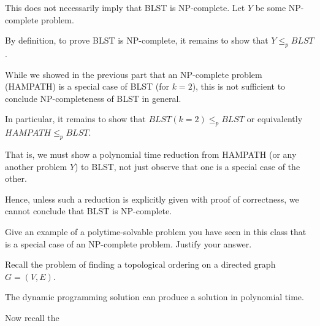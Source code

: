 \begin{questions}
	\ifsolutions\fi

	\begin{soln}
		This does not necessarily imply that BLST is NP-complete. Let \(Y\) be some NP-complete problem.

		By definition, to prove BLST is NP-complete, it remains to show that \(Y \leq_p BLST\).

		While we showed in the previous part that an NP-complete problem (HAMPATH) is a special case of BLST (for \( k = 2 \)), this is not sufficient to conclude NP-completeness of BLST in general.

		In particular, it remains to show that \(BLST(k = 2) \leq_p BLST\) or equivalently \(HAMPATH \leq_p BLST\).

		That is, we must show a polynomial time reduction from HAMPATH (or any another problem \(Y\)) to BLST, not just observe that one is a special case of the other.

		Hence, unless such a reduction is explicitly given with proof of correctness, we cannot conclude that BLST is NP-complete.
	\end{soln}


	\question[4] Give an example of a polytime-solvable problem you have seen in this class that is a special case of an NP-complete problem. Justify your answer.

	\ifsolutions\fi

	\begin{soln}
		Recall the problem of finding a topological ordering on a directed graph \(G = (V, E)\).

		The dynamic programming solution can produce a solution in polynomial time.



		Now recall the
	\end{soln}

\end{questions}

